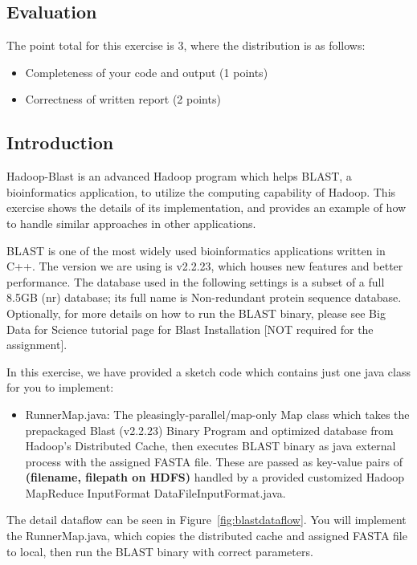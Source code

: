 \subsection*{Evaluation} 

The point total for this exercise is 3, where the distribution is as follows:
\begin{itemize} 
\item	Completeness of your code and output (1 points)
\item	Correctness of written report (2 points)
\end{itemize}

\subsection*{Introduction}   

Hadoop-Blast is an advanced Hadoop program which helps BLAST, a bioinformatics
application, to utilize the computing capability of Hadoop. This exercise shows
the details of its implementation, and provides an example of how to handle
similar approaches in other applications.

BLAST is one of the most widely used bioinformatics applications written in
C++. The version we are using is v2.2.23, which houses new features and better
performance. The database used in the following settings is a subset of a full
8.5GB (nr) database; its full name is Non-redundant protein sequence database.
Optionally, for more details on how to run the BLAST binary, please see Big
Data for Science tutorial page for Blast Installation [NOT required for the
assignment].

In this exercise, we have provided a sketch code which contains just one java
class for you to implement:

\begin{itemize}
\item RunnerMap.java: The pleasingly-parallel/map-only Map class which takes
the prepackaged Blast (v2.2.23) Binary Program and optimized database from
Hadoop's Distributed Cache, then executes BLAST binary as java external process
with the assigned FASTA file. These are passed as key-value pairs of
\textbf{(filename, filepath on HDFS)} handled by a provided customized Hadoop
MapReduce InputFormat DataFileInputFormat.java.  
\end{itemize}

The detail dataflow can be seen in Figure~\ref{fig:blastdataflow}. You will
implement the RunnerMap.java, which copies the distributed cache and assigned
FASTA file to local, then run the BLAST binary with correct parameters.

